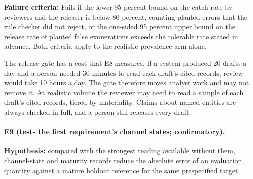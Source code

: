 \documentclass[
  11pt,
]{article}
\begin{document}
\textbf{Failure criteria:} Fails if the lower 95 percent bound on the
catch rate by reviewers and the releaser is below 80 percent, counting
planted errors that the rule checker did not reject, or the one-sided 95
percent upper bound on the release rate of planted false exonerations
exceeds the tolerable rate stated in advance. Both criteria apply to the
realistic-prevalence arm alone.

The release gate has a cost that E8 measures. If a system produced 20
drafts a day and a person needed 30 minutes to read each draft's cited
records, review would take 10 hours a day. The gate therefore moves
analyst work and may not remove it. At realistic volume the reviewer may
need to read a sample of each draft's cited records, tiered by
materiality. Claims about named entities are always checked in full, and
a person still releases every draft.

\hypertarget{e9-tests-the-first-requirements-channel-states-confirmatory.}{%
\paragraph{E9 (tests the first requirement's channel states;
confirmatory).}\label{e9-tests-the-first-requirements-channel-states-confirmatory.}}

\textbf{Hypothesis:} compared with the strongest reading available
without them, channel-state and maturity records reduce the absolute
error of an evaluation quantity against a mature holdout reference for
the same prespecified target.
\end{document}
